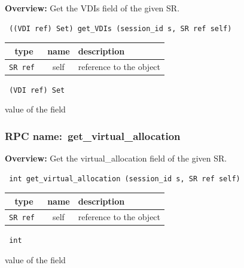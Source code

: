 {\bf Overview:} 
Get the VDIs field of the given SR.

\begin{verbatim} ((VDI ref) Set) get_VDIs (session_id s, SR ref self)\end{verbatim}



 
\vspace{0.3cm}
\begin{tabular}{|c|c|p{7cm}|}
 \hline
{\bf type} & {\bf name} & {\bf description} \\ \hline
{\tt SR ref } & self & reference to the object \\ \hline 

\end{tabular}

\vspace{0.3cm}

{\tt 
(VDI ref) Set
}


value of the field
\vspace{0.3cm}
\vspace{0.3cm}
\vspace{0.3cm}
\subsubsection{RPC name:~get\_virtual\_allocation}

{\bf Overview:} 
Get the virtual\_allocation field of the given SR.

\begin{verbatim} int get_virtual_allocation (session_id s, SR ref self)\end{verbatim}



 
\vspace{0.3cm}
\begin{tabular}{|c|c|p{7cm}|}
 \hline
{\bf type} & {\bf name} & {\bf description} \\ \hline
{\tt SR ref } & self & reference to the object \\ \hline 

\end{tabular}

\vspace{0.3cm}

{\tt 
int
}


value of the field
\vspace{0.3cm}
\vspace{0.3cm}
\vspace{0.3cm}
